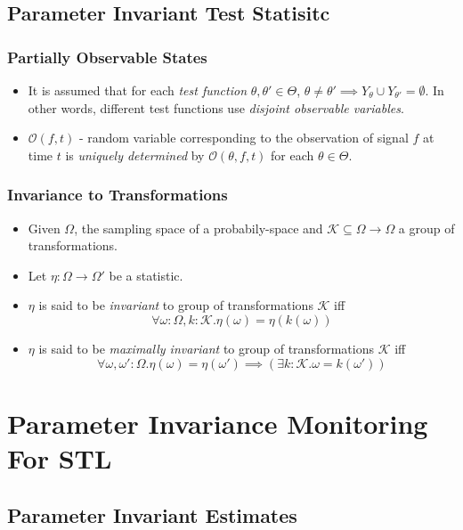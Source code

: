\documentclass{beamer}
\newcommand{\observe}{\mathcal{O}}
\newcommand{\K}{\mathcal{K}}
\begin{document}
\subsection{Parameter Invariant Test Statisitc}

\begin{frame}
    \frametitle{Partially Observable States}
    \begin{itemize}
        \item It is assumed that for each \textit{test function}
            $\theta, \theta' \in \Theta$, $\theta \neq \theta' \implies
            Y_{\theta} \cup Y_{\theta'} = \emptyset$. In other words,
            different test functions use \textit{disjoint observable variables}.
        \item $\observe(f, t)$ - random variable corresponding to
            the observation of signal $f$ at time $t$ is \textit{uniquely determined}
            by $\observe(\theta, f, t)$ for each $\theta \in \Theta$.
    \end{itemize}
\end{frame}

\begin{frame}
    \frametitle{Invariance to Transformations}
    \begin{itemize}
        \item Given $\Omega$, the sampling space
            of a probabily-space and $\K \subseteq \Omega \to \Omega$
            a group of transformations.
        \item Let $\eta : \Omega \to \Omega'$ be a statistic.
        \item $\eta$ is said to be \textit{invariant} to
            group of transformations $\K$ iff
            $$ \forall \omega : \Omega, k : \K . \eta(\omega) = \eta(k(\omega))$$
        \item $\eta$ is said to be \textit{maximally invariant} to
            group of transformations $\K$ iff
            $$ \forall \omega, \omega' : \Omega . \eta(\omega) = \eta(\omega')
            \implies (\exists k : \K . \omega = k(\omega'))$$
    \end{itemize}
\end{frame}

\section{Parameter Invariance Monitoring For STL}
\subsection{Parameter Invariant Estimates}
\end{document}
